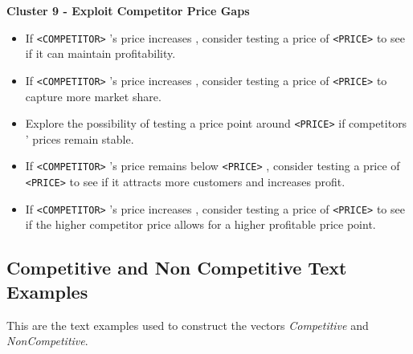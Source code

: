 \textbf{Cluster 9 - Exploit Competitor Price Gaps}
\begin{itemize}
    \item If \texttt{<COMPETITOR>} 's price increases , consider testing a price of \texttt{<PRICE>} to see if it can maintain profitability.
    \item If \texttt{<COMPETITOR>} 's price increases , consider testing a price of \texttt{<PRICE>} to capture more market share.
    \item Explore the possibility of testing a price point around \texttt{<PRICE>} if competitors ' prices remain stable.
    \item If \texttt{<COMPETITOR>} 's price remains below \texttt{<PRICE>} , consider testing a price of \texttt{<PRICE>} to see if it attracts more customers and increases profit.
    \item If \texttt{<COMPETITOR>} 's price increases , consider testing a price of \texttt{<PRICE>} to see if the higher competitor price allows for a higher profitable price point.
\end{itemize}


\subsection*{Competitive and Non Competitive Text Examples}\label{app:text_examples_comp_score}
This are the text examples used to construct the vectors \textit{Competitive} and \textit{NonCompetitive}.

